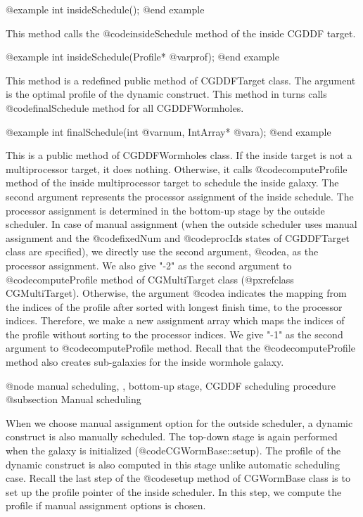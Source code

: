 {@example
int insideSchedule();
@end example

This method calls the @code{insideSchedule} method of the inside CGDDF target.

@example
int insideSchedule(Profile* @var{prof});
@end example

This method is a redefined public method of CGDDFTarget class. The argument is
the optimal profile of the dynamic construct. This method in turns calls
@code{finalSchedule} method for all CGDDFWormholes.

@example
int finalSchedule(int @var{num}, IntArray* @var{a});
@end example

This is a public method of CGDDFWormholes class. If the inside target is
not a multiprocessor target, it does nothing. Otherwise, it calls
@code{computeProfile} method of the inside multiprocessor target to
schedule the inside galaxy. The second argument represents the
processor assignment of the inside schedule. The processor assignment
is determined in the bottom-up stage by the outside scheduler.
In case of manual assignment (when the outside scheduler uses manual
assignment and the @code{fixedNum} and @code{procIds} states of CGDDFTarget
class are specified), we directly use the second argument, @code{a}, as the
processor assignment. We also give "-2" as the second argument to 
@code{computeProfile} method of CGMultiTarget class 
(@pxref{class CGMultiTarget}). 
Otherwise, the argument @code{a} indicates the mapping from
the indices of the profile after sorted with longest finish time, to the
processor indices. Therefore, we make a new assignment array which maps
the indices of the profile without sorting to the processor indices.
We give "-1" as the second argument to @code{computeProfile} method.
Recall that the @code{computeProfile} method also creates sub-galaxies
for the inside wormhole galaxy. 

@node manual scheduling, , bottom-up stage, CGDDF scheduling procedure
@subsection Manual scheduling

When we choose manual assignment option for the outside scheduler,
a dynamic construct is also manually scheduled. The top-down stage is
again performed when the galaxy is initialized (@code{CGWormBase::setup}).
The profile of the dynamic construct is also computed in this stage
unlike automatic scheduling case. Recall the last step of
the @code{setup} method of CGWormBase class is to set up the profile
pointer of the inside scheduler. In this step, we compute the profile
if manual assignment options is chosen.

}
